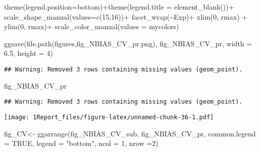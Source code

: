 \documentclass[
]{article}
\newenvironment{Shaded}{\begin{snugshade}}{\end{snugshade}}
\newcommand{\AttributeTok}[1]{\textcolor[rgb]{0.77,0.63,0.00}{#1}}
\newcommand{\ConstantTok}[1]{\textcolor[rgb]{0.00,0.00,0.00}{#1}}
\newcommand{\DecValTok}[1]{\textcolor[rgb]{0.00,0.00,0.81}{#1}}
\newcommand{\FloatTok}[1]{\textcolor[rgb]{0.00,0.00,0.81}{#1}}
\newcommand{\FunctionTok}[1]{\textcolor[rgb]{0.00,0.00,0.00}{#1}}
\newcommand{\NormalTok}[1]{#1}
\newcommand{\OtherTok}[1]{\textcolor[rgb]{0.56,0.35,0.01}{#1}}
\newcommand{\SpecialCharTok}[1]{\textcolor[rgb]{0.00,0.00,0.00}{#1}}
\newcommand{\StringTok}[1]{\textcolor[rgb]{0.31,0.60,0.02}{#1}}
\begin{document}
\begin{Shaded}
\begin{Highlighting}[]
  \FunctionTok{theme}\NormalTok{(}\AttributeTok{legend.position=}\StringTok{\textquotesingle{}bottom\textquotesingle{}}\NormalTok{)}\SpecialCharTok{+}\FunctionTok{theme}\NormalTok{(}\AttributeTok{legend.title =} \FunctionTok{element\_blank}\NormalTok{())}\SpecialCharTok{+}
  \FunctionTok{scale\_shape\_manual}\NormalTok{(}\AttributeTok{values=}\FunctionTok{c}\NormalTok{(}\DecValTok{15}\NormalTok{,}\DecValTok{16}\NormalTok{))}\SpecialCharTok{+}
  \FunctionTok{facet\_wrap}\NormalTok{(}\SpecialCharTok{\textasciitilde{}}\NormalTok{Exp)}\SpecialCharTok{+}
  \FunctionTok{xlim}\NormalTok{(}\DecValTok{0}\NormalTok{, rmax) }\SpecialCharTok{+} \FunctionTok{ylim}\NormalTok{(}\DecValTok{0}\NormalTok{, rmax)}\SpecialCharTok{+}
  \FunctionTok{scale\_color\_manual}\NormalTok{(}\AttributeTok{values =}\NormalTok{ mycolors) }
  
\FunctionTok{ggsave}\NormalTok{(}\FunctionTok{file.path}\NormalTok{(}\StringTok{\textquotesingle{}figures\textquotesingle{}}\NormalTok{,}\StringTok{\textquotesingle{}fig\_NBIAS\_CV\_pr.png\textquotesingle{}}\NormalTok{), fig\_NBIAS\_CV\_pr, }\AttributeTok{width =} \FloatTok{6.5}\NormalTok{, }\AttributeTok{height =} \DecValTok{4}\NormalTok{)}
\end{Highlighting}
\end{Shaded}

\begin{verbatim}
## Warning: Removed 3 rows containing missing values (geom_point).
\end{verbatim}

\begin{Shaded}
\begin{Highlighting}[]
\NormalTok{fig\_NBIAS\_CV\_pr}
\end{Highlighting}
\end{Shaded}

\begin{verbatim}
## Warning: Removed 3 rows containing missing values (geom_point).
\end{verbatim}

\texttt{[image: 1Report\_files/figure-latex/unnamed-chunk-36-1.pdf]}

\begin{Shaded}
\begin{Highlighting}[]
\NormalTok{fig\_CV}\OtherTok{\textless{}{-}} \FunctionTok{ggarrange}\NormalTok{(fig\_NBIAS\_CV\_sub,  fig\_NBIAS\_CV\_pr, }\AttributeTok{common.legend =} \ConstantTok{TRUE}\NormalTok{, }\AttributeTok{legend =} \StringTok{"bottom"}\NormalTok{, }\AttributeTok{ncol =} \DecValTok{1}\NormalTok{, }\AttributeTok{nrow =}\DecValTok{2}\NormalTok{)}
\end{Highlighting}
\end{Shaded}
\end{document}
